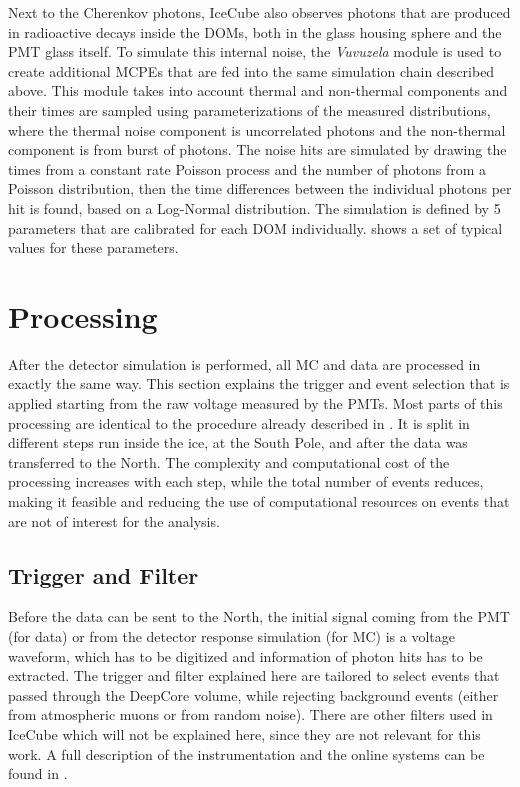 Next to the Cherenkov photons, IceCube also observes photons that are produced in radioactive decays inside the DOMs, both in the glass housing sphere and the PMT glass itself. To simulate this internal noise, the \emph{Vuvuzela} module  is used to create additional MCPEs that are fed into the same simulation chain described above. This module takes into account thermal and non-thermal components and their times are sampled using parameterizations of the measured distributions, where the thermal noise component is uncorrelated photons and the non-thermal component is from burst of photons. The noise hits are simulated by drawing the times from a constant rate Poisson process and the number of photons from a Poisson distribution, then the time differences between the individual photons per hit is found, based on a Log-Normal distribution. The simulation is defined by 5 parameters that are calibrated for each DOM individually.  shows a set of typical values for these parameters. 


\section{Processing}

After the detector simulation is performed, all MC and data are processed in exactly the same way. This section explains the trigger and event selection that is applied starting from the raw voltage measured by the PMTs. Most parts of this processing are identical to the procedure already described in . It is split in different steps run inside the ice, at the South Pole, and after the data was transferred to the North. The complexity and computational cost of the processing increases with each step, while the total number of events reduces, making it feasible and reducing the use of computational resources on events that are not of interest for the analysis. 


\subsection{Trigger and Filter} 

Before the data can be sent to the North, the initial signal coming from the PMT (for data) or from the detector response simulation (for MC) is a voltage waveform, which has to be digitized and information of photon hits has to be extracted. The trigger and filter explained here are tailored to select events that passed through the DeepCore volume, while rejecting background events (either from atmospheric muons or from random noise). There are other filters used in IceCube which will not be explained here, since they are not relevant for this work. A full description of the instrumentation and the online systems can be found in .


